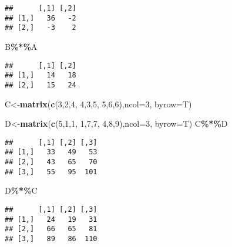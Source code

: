 \documentclass[
]{article}
\newenvironment{Shaded}{\begin{snugshade}}{\end{snugshade}}
\newcommand{\DataTypeTok}[1]{\textcolor[rgb]{0.13,0.29,0.53}{#1}}
\newcommand{\DecValTok}[1]{\textcolor[rgb]{0.00,0.00,0.81}{#1}}
\newcommand{\KeywordTok}[1]{\textcolor[rgb]{0.13,0.29,0.53}{\textbf{#1}}}
\newcommand{\NormalTok}[1]{#1}
\newcommand{\OperatorTok}[1]{\textcolor[rgb]{0.81,0.36,0.00}{\textbf{#1}}}
\begin{document}
\begin{verbatim}
##      [,1] [,2]
## [1,]   36   -2
## [2,]   -3    2
\end{verbatim}

\begin{Shaded}
\begin{Highlighting}[]
\NormalTok{B}\OperatorTok{\%*\%}\NormalTok{A}
\end{Highlighting}
\end{Shaded}

\begin{verbatim}
##      [,1] [,2]
## [1,]   14   18
## [2,]   15   24
\end{verbatim}

\begin{Shaded}
\begin{Highlighting}[]
\NormalTok{C\textless{}{-}}\KeywordTok{matrix}\NormalTok{(}\KeywordTok{c}\NormalTok{(}\DecValTok{3}\NormalTok{,}\DecValTok{2}\NormalTok{,}\DecValTok{4}\NormalTok{,}
            \DecValTok{4}\NormalTok{,}\DecValTok{3}\NormalTok{,}\DecValTok{5}\NormalTok{,}
            \DecValTok{5}\NormalTok{,}\DecValTok{6}\NormalTok{,}\DecValTok{6}\NormalTok{),}\DataTypeTok{ncol=}\DecValTok{3}\NormalTok{, }\DataTypeTok{byrow=}\NormalTok{T)}

\NormalTok{D\textless{}{-}}\KeywordTok{matrix}\NormalTok{(}\KeywordTok{c}\NormalTok{(}\DecValTok{5}\NormalTok{,}\DecValTok{1}\NormalTok{,}\DecValTok{1}\NormalTok{,}
            \DecValTok{1}\NormalTok{,}\DecValTok{7}\NormalTok{,}\DecValTok{7}\NormalTok{,}
            \DecValTok{4}\NormalTok{,}\DecValTok{8}\NormalTok{,}\DecValTok{9}\NormalTok{),}\DataTypeTok{ncol=}\DecValTok{3}\NormalTok{, }\DataTypeTok{byrow=}\NormalTok{T)}
\NormalTok{C}\OperatorTok{\%*\%}\NormalTok{D}
\end{Highlighting}
\end{Shaded}

\begin{verbatim}
##      [,1] [,2] [,3]
## [1,]   33   49   53
## [2,]   43   65   70
## [3,]   55   95  101
\end{verbatim}

\begin{Shaded}
\begin{Highlighting}[]
\NormalTok{D}\OperatorTok{\%*\%}\NormalTok{C}
\end{Highlighting}
\end{Shaded}

\begin{verbatim}
##      [,1] [,2] [,3]
## [1,]   24   19   31
## [2,]   66   65   81
## [3,]   89   86  110
\end{verbatim}
\end{document}
